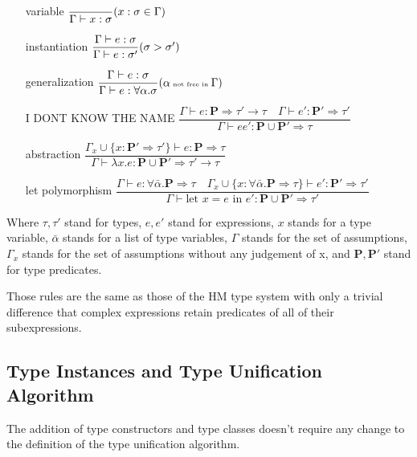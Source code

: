 \begin{enumerate}
    \item[variable] $\dfrac{}{\Gamma \vdash x : \sigma}\tiny{(x : \sigma \in \Gamma)}$
    \item[instantiation] $\dfrac{\Gamma \vdash e : \sigma}{\Gamma \vdash e : \sigma'}\tiny{(\sigma > \sigma')}$
    \item[generalization] $\dfrac{\Gamma \vdash e : \sigma}{\Gamma \vdash e : \forall \alpha . \sigma}\tiny{(\alpha \text{ not free in }\Gamma)}$
    \item[I DONT KNOW THE NAME] $\dfrac{\Gamma \vdash e : \mathbf{P} \Rightarrow \tau' \rightarrow \tau \quad \Gamma \vdash e' : \mathbf{P'} \Rightarrow \tau' }{\Gamma \vdash e e' : \mathbf{P} \cup \mathbf{P'}  \Rightarrow \tau}$ %
    \item[abstraction] $\dfrac{\Gamma_x \cup \{x : \mathbf{P'} \Rightarrow \tau'\} \vdash e : \mathbf{P} \Rightarrow \tau}{\Gamma \vdash \lambda x . e : \mathbf{P} \cup \mathbf{P'} \Rightarrow \tau' \rightarrow \tau}$
    \item[let polymorphism] $\dfrac{\Gamma \vdash e : \forall \bar{\alpha} .  \mathbf{P} \Rightarrow \tau \quad \Gamma_x \cup \{x :\forall \bar{\alpha} .  \mathbf{P} \Rightarrow \tau \} \vdash e' : \mathbf{P'} \Rightarrow \tau'}{\Gamma \vdash \text{let } x = e \text{ in } e' : \mathbf{P} \cup \mathbf{P'} \Rightarrow \tau'}$
\end{enumerate}

Where $\tau, \tau'$ stand for types, $e, e'$ stand for expressions, $x$ stands for a type variable, $\bar{\alpha}$ stands for a list of type variables, $\Gamma$ stands for the set of assumptions, $\Gamma_x$ stands for the set of assumptions without any judgement of x, and $\mathbf{P}, \mathbf{P'}$ stand for type predicates.

Those rules are the same as those of the HM type system with only a trivial difference that complex expressions retain predicates of all of their subexpressions.


\subsection{Type Instances and Type Unification Algorithm}


The addition of type constructors and type classes doesn't require any change to the definition of the type unification algorithm.

